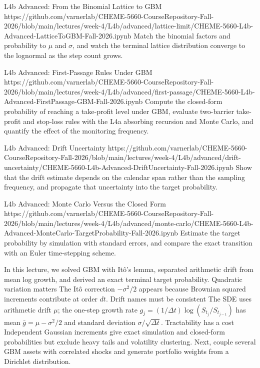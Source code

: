 \documentclass[11pt]{article}
\begin{document}
\notebooklink
  {L4b Advanced: From the Binomial Lattice to GBM}
  {https://github.com/varnerlab/CHEME-5660-CourseRepository-Fall-2026/blob/main/lectures/week-4/L4b/advanced/lattice-limit/CHEME-5660-L4b-Advanced-LatticeToGBM-Fall-2026.ipynb}
  {Match the binomial factors and probability to $\mu$ and $\sigma$, and watch the terminal lattice distribution converge to the lognormal as the step count grows.}

\notebooklink
  {L4b Advanced: First-Passage Rules Under GBM}
  {https://github.com/varnerlab/CHEME-5660-CourseRepository-Fall-2026/blob/main/lectures/week-4/L4b/advanced/first-passage/CHEME-5660-L4b-Advanced-FirstPassage-GBM-Fall-2026.ipynb}
  {Compute the closed-form probability of reaching a take-profit level under GBM, evaluate two-barrier take-profit and stop-loss rules with the L4a absorbing recursion and Monte Carlo, and quantify the effect of the monitoring frequency.}

\notebooklink
  {L4b Advanced: Drift Uncertainty}
  {https://github.com/varnerlab/CHEME-5660-CourseRepository-Fall-2026/blob/main/lectures/week-4/L4b/advanced/drift-uncertainty/CHEME-5660-L4b-Advanced-DriftUncertainty-Fall-2026.ipynb}
  {Show that the drift estimate depends on the calendar span rather than the sampling frequency, and propagate that uncertainty into the target probability.}

\notebooklink
  {L4b Advanced: Monte Carlo Versus the Closed Form}
  {https://github.com/varnerlab/CHEME-5660-CourseRepository-Fall-2026/blob/main/lectures/week-4/L4b/advanced/monte-carlo/CHEME-5660-L4b-Advanced-MonteCarlo-TargetProbability-Fall-2026.ipynb}
  {Estimate the target probability by simulation with standard errors, and compare the exact transition with an Euler time-stepping scheme.}

\newpage
\thispagestyle{fancy}
\keytakeaways
  {In this lecture, we solved GBM with It\^o's lemma, separated arithmetic drift from mean log growth, and derived an exact terminal target probability.}
  {Quadratic variation matters}
  {The It\^o correction $-\sigma^2/2$ appears because Brownian squared increments contribute at order $dt$.}
  {Drift names must be consistent}
  {The SDE uses arithmetic drift $\mu$; the one-step growth rate $g_j=(1/\Delta t)\log(S_{t_j}/S_{t_{j-1}})$ has mean $\bar g=\mu-\sigma^2/2$ and standard deviation $\sigma/\sqrt{\Delta t}$.}
  {Tractability has a cost}
  {Independent Gaussian increments give exact simulation and closed-form probabilities but exclude heavy tails and volatility clustering.}
  {Next, couple several GBM assets with correlated shocks and generate portfolio weights from a Dirichlet distribution.}
\end{document}
